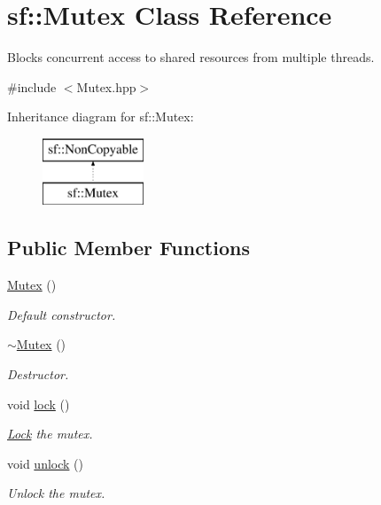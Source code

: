 \hypertarget{classsf_1_1Mutex}{\section{sf\-:\-:Mutex Class Reference}
\label{classsf_1_1Mutex}
}


Blocks concurrent access to shared resources from multiple threads.  




{\ttfamily \#include $<$Mutex.\-hpp$>$}

Inheritance diagram for sf\-:\-:Mutex\-:\begin{figure}[H]
\begin{center}
\leavevmode
\includegraphics[height=2.000000cm]{classsf_1_1Mutex}
\end{center}
\end{figure}
\subsection*{Public Member Functions}
\begin{DoxyCompactItemize}
\item 
\hypertarget{classsf_1_1Mutex_a9bd52a48320fd7b6db8a78037aad276e}{\hyperlink{classsf_1_1Mutex_a9bd52a48320fd7b6db8a78037aad276e}{Mutex} ()}\label{classsf_1_1Mutex_a9bd52a48320fd7b6db8a78037aad276e}

\begin{DoxyCompactList}\small\item\em Default constructor. \end{DoxyCompactList}\item 
\hypertarget{classsf_1_1Mutex_a9f76a67b7b6d3918131a692179b4e3f2}{\hyperlink{classsf_1_1Mutex_a9f76a67b7b6d3918131a692179b4e3f2}{$\sim$\-Mutex} ()}\label{classsf_1_1Mutex_a9f76a67b7b6d3918131a692179b4e3f2}

\begin{DoxyCompactList}\small\item\em Destructor. \end{DoxyCompactList}\item 
void \hyperlink{classsf_1_1Mutex_a1a16956a6bbea764480c1b80f2e45763}{lock} ()
\begin{DoxyCompactList}\small\item\em \hyperlink{classsf_1_1Lock}{Lock} the mutex. \end{DoxyCompactList}\item 
void \hyperlink{classsf_1_1Mutex_ade71268ffc5e80756652058b01c23c33}{unlock} ()
\begin{DoxyCompactList}\small\item\em Unlock the mutex. \end{DoxyCompactList}\end{DoxyCompactItemize}



